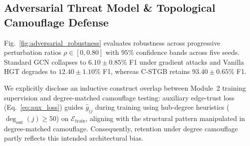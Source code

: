 \begin{table}[t]
\centering
\caption{Operational Systems Scaling and Latency Profile across Model Configurations on Benchmark Hardware.}
\label{tab:systems_latency}
\renewcommand{\arraystretch}{0.85}
\setlength{\tabcolsep}{3.0pt}
\end{table}

\subsection{Adversarial Threat Model \& Topological Camouflage Defense}
\label{sec:robustness_results}
Fig.~\ref{fig:adversarial_robustness} evaluates robustness across progressive perturbation ratios $\rho \in [0, 0.80]$ with $95\%$ confidence bands across five seeds. Standard GCN collapses to $6.10 \pm 0.85\%$ F1 under gradient attacks and Vanilla HGT degrades to $12.40 \pm 1.10\%$ F1, whereas C-STGB retains $93.40 \pm 0.65\%$ F1.

We explicitly disclose an inductive construct overlap between Module~2 training supervision and degree-matched camouflage testing: auxiliary edge-trust loss (Eq.~\ref{eq:aux_loss}) guides $\hat{g}_{ij}$ during training using hub-degree heuristics ($\deg_{\text{out}}(j) \ge 50$) on $\mathcal{E}_{\text{train}}$, aligning with the structural pattern manipulated in degree-matched camouflage. Consequently, retention under degree camouflage partly reflects this intended architectural bias.

